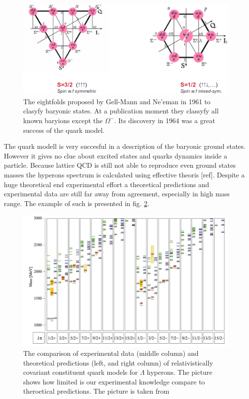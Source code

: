 \begin{figure}[hb]
  \centering
  \includegraphics[width=0.9 \linewidth]{Chapter_introduction/eightfolds.eps}
  \caption{The eightfolds proposed by Gell-Mann and Ne'eman in 1961 to clasyfy baryonic states. At a publication moment they classyfy all known baryions except the $\Omega^-$. Its discovery in 1964 \cite{omega} was a great success of the quark model. }
  \label{fig:eigh}
\end{figure}

The quark modell is very succesful in a description of the baryonic ground states. However it gives no clue about excited states and quarks dynamics inside a particle. Because lattice QCD is still not able to reproduce even ground states masses the hyperons spectrum is calculated using effective theoris [ref]. Despite a huge theoretical end experimental effort a theoretical predictions and experimental data are still far away from agreement, especially in high mass range. The example of such is presented in fig. \ref{fig:spectrum}.

\begin{figure}[hb]
  \centering
  \includegraphics[width=0.99 \linewidth]{Chapter_introduction/spectrum.png}
  \caption{The comparison of experimental data (middle column) and theoretical predictions (left, and right column) of relativistically covariant constituent quark models for $\Lambda$ hyperons. The picture shows how limited is our experimental knowledge compare to theroetical predictions. The picture is taken from \cite{Ronniger2012}}
  \label{fig:spectrum}
\end{figure}
